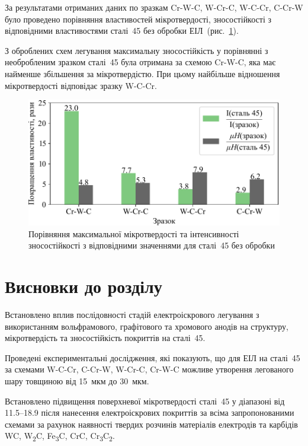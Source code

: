 \documentclass[a4paper,fontsize=14bp,ukrainian]{extreport}
\begin{document}
За результатами отриманих даних по зразкам Cr-W-C, W-Cr-C, W-C-Cr, C-Cr-W було проведено порівняння властивостей мікротвердості, зносостійкості з відповідними властивостями сталі~45 без обробки ЕІЛ~(рис.~\ref{fig:comp_wh}).

З оброблених схем легування максимальну зносостійкість у порівнянні з необробленим зразком сталі~45 була отримана за схемою Cr-W-C, яка має найменше збільшення за мікротвердістю. При цьому найбільше відношення мікротвердості відповідає зразку W-C-Cr.


\begin{figure}[H]
\centering
\vspace{-0.5cm}
\includegraphics[]{comp_wh.pdf}
\caption{Порівняння максимальної мікротвердості та інтенсивності зносостійкості з відповідними значеннями для сталі~45 без обробки}
\label{fig:comp_wh}
\end{figure}



\section{Висновки до розділу~\thechapter}

Встановлено вплив послідовності стадій електроіскрового легування з використанням вольфрамового, графітового та хромового анодів на структуру, мікротвердість та зносостійкість покриттів на сталі~45.

Проведені експериментальні дослідження, які показують, що для ЕІЛ на сталі~45 за схемами W-C-Cr, C-Cr-W, W-Cr-C, Cr-W-C можливе утворення легованого шару товщиною від 15~мкм до 30~мкм.

Встановлено підвищення поверхневої мікротвердості сталі~45 у діапазоні від \SIrange{11.5}{18.9}{\gpa} після нанесення електроіскрових покриттів за всіма запропонованими схемами за рахунок наявності твердих розчинів матеріалів електродів та  карбідів WC, W\textsubscript{2}C, Fe\textsubscript{3}C, CrC, Cr\textsubscript{3}C\textsubscript{2}.
\end{document}

